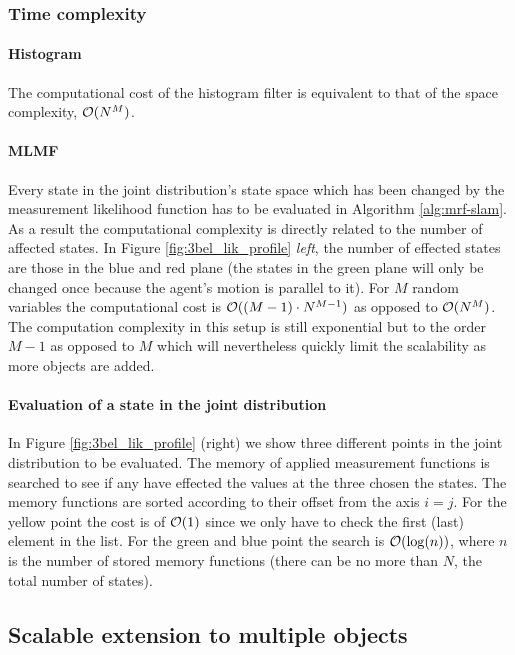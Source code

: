 \subsubsection{Time complexity}

\paragraph{Histogram}
The computational cost of the histogram filter is equivalent to that of the space complexity, $\operatorname{\mathcal{O}}(N^M)$.

\paragraph{MLMF}

Every state in the joint distribution's state space which has been changed by the measurement likelihood function has to be
evaluated in Algorithm \ref{alg:mrf-slam}. As a result the computational complexity is directly related to the number 
of affected states. In Figure \ref{fig:3bel_lik_profile} \textit{left}, the number of effected states are those in the blue
and red plane (the states in the green plane will only be changed once because the agent's motion is parallel to it).
For $M$ random variables the computational cost is $\operatorname{\mathcal{O}}((M-1) \cdot N^{M-1})$ as opposed to $\operatorname{\mathcal{O}}(N^M)$. The computation complexity
in this setup is still exponential but to the order $M-1$ as opposed to $M$ which will nevertheless quickly limit the scalability as more objects are added. 

\paragraph{Evaluation of a state in the joint distribution}

In Figure \ref{fig:3bel_lik_profile} (right) we show three different points in the joint distribution to be evaluated. 
The memory of applied measurement functions is searched to see if any have effected the values at the three chosen the states. 
The memory functions are sorted according to their offset from the axis $i=j$. For the yellow point the cost is 
of $\operatorname{\mathcal{O}}(1)$ since we only have to check the first (last) element in the list. For the green and blue point the 
search is $\operatorname{\mathcal{O}}(\log(n))$, where $n$ is the number of stored memory functions (there can be no more than $N$, the total number of states). 


\subsection{Scalable extension to multiple objects}\label{subsec:scalabe_extension}

